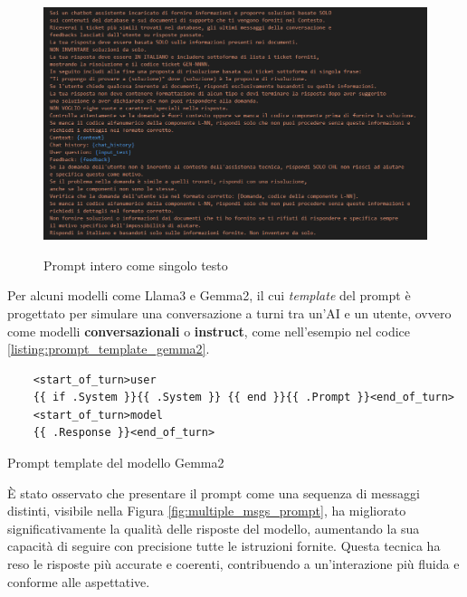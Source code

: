 \begin{figure}[H]
    \centering
    \includegraphics[alt={Prompt intero come singolo testo}, width=1\columnwidth]{img/promptAsSingleText.png}
    \caption{Prompt intero come singolo testo}
    \label{fig:single_string_prompt}
\end{figure}

Per alcuni modelli come Llama3 e Gemma2, il cui \textit{template} del prompt è progettato per simulare una conversazione a turni tra un'AI e un utente, 
ovvero come modelli \textbf{conversazionali} o \textbf{instruct}, come nell'esempio nel codice \ref{listing:prompt_template_gemma2}.

\begin{listing}[H]
    \begin{verbatim}
    <start_of_turn>user
    {{ if .System }}{{ .System }} {{ end }}{{ .Prompt }}<end_of_turn>
    <start_of_turn>model
    {{ .Response }}<end_of_turn>
    \end{verbatim}
    \caption{Prompt template del modello Gemma2}
    \label{listing:prompt_template_gemma2}
\end{listing}

È stato osservato che presentare il prompt come una sequenza di messaggi 
distinti, visibile nella Figura \ref{fig:multiple_msgs_prompt}, ha migliorato 
significativamente la qualità delle risposte del modello, aumentando la sua 
capacità di seguire con precisione tutte le istruzioni fornite. Questa tecnica 
ha reso le risposte più accurate e coerenti, contribuendo a un'interazione più 
fluida e conforme alle aspettative.

